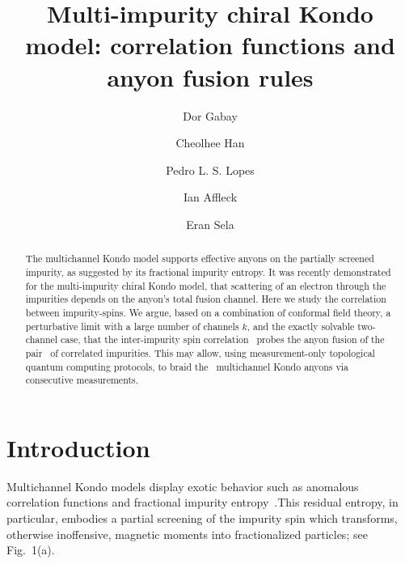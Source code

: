 \documentclass[aps,prb,twocolumn,superscriptaddress]{revtex4-1}
\begin{document}
	

\title{Multi-impurity chiral Kondo model: correlation functions and anyon fusion rules}
\author{Dor Gabay}

\author{Cheolhee Han}

\author{Pedro L. S. Lopes}

\author{Ian Affleck}

\author{Eran Sela}


\begin{abstract}
	The multichannel Kondo model supports effective anyons on the partially screened impurity, as suggested by its fractional impurity entropy. It was recently demonstrated for the multi-impurity chiral Kondo model, that  scattering of an electron through the impurities depends on the anyon's total fusion channel. Here we study the correlation between impurity-spins. We argue, based on a combination of conformal field theory, a perturbative limit with a large number of channels $k$, and the exactly solvable two-channel case, that the inter-impurity spin correlation  probes the anyon fusion of the pair  of correlated impurities. This may allow, using measurement-only topological quantum computing  protocols, to braid the  multichannel Kondo anyons via consecutive measurements. 
\end{abstract}

\maketitle	

\linespread{1} 

\section{Introduction} 
Multichannel Kondo models display exotic behavior such as anomalous correlation functions and fractional impurity entropy~\cite{affleck1993exact,ludwig1994exact,potok2007observation,andrei1980diagonalization,vigman1980exact,affleck1991universal,han2021entropy}.This residual entropy, in particular, embodies a partial screening of the impurity spin which transforms, otherwise inoffensive, magnetic moments into fractionalized particles; see Fig.~1(a). 
\end{document}
